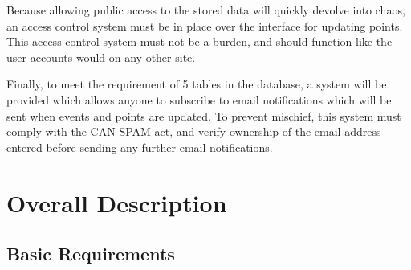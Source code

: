 \documentclass{scrreprt}
\begin{document}
Because allowing public access to the stored data will quickly devolve into chaos, an access control system must be in place over the interface for updating points. This access control system must not be a burden, and should function like the user accounts would on any other site.

Finally, to meet the requirement of 5 tables in the database, a system will be provided which allows anyone to subscribe to email notifications which will be sent when events and points are updated. To prevent mischief, this system must comply with the CAN-SPAM act, and verify ownership of the email address entered before sending any further email notifications.
    
\chapter{Overall Description}
    \section{Basic Requirements}
    
\end{document}
